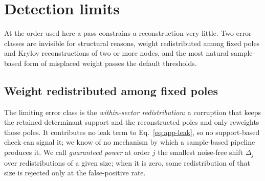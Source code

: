 \documentclass[aps,prb,reprint,onecolumn,12pt,superscriptaddress,longbibliography,floatfix]{revtex4-2}
\begin{document}
\section{Detection limits}
\label{sec:pass}
\label{sec:detect}
At the order used here a pass constrains a reconstruction very little. Two error classes are invisible for structural reasons, weight redistributed among fixed poles and Krylov reconstructions of two or more nodes, and the most natural sample-based form of misplaced weight passes the default thresholds.

\subsection{Weight redistributed among fixed poles}
\label{sec:fixedpole}
The limiting error class is the \emph{within-sector redistribution}: a corruption that keeps the retained determinant support and the reconstructed poles and only reweights those poles. It contributes no leak term to Eq.~\eqref{eq:app-leak}, so no support-based check can signal it; we know of no mechanism by which a sample-based pipeline produces it. We call \emph{guaranteed power} at order $j$ the smallest noise-free shift $\Delta_j$ over redistributions of a given size; when it is zero, some redistribution of that size is rejected only at the false-positive rate.
\end{document}
